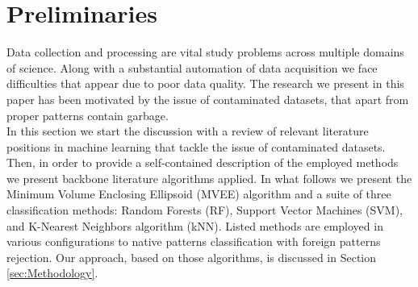\documentclass{llncs}
\begin{document}
\section{Preliminaries}
  \label{sec:preliminaries}
  
  
  
    
Data collection and processing are vital study problems across multiple domains of science. Along with a substantial automation of data acquisition we face difficulties that appear due to poor data quality. The research we present in this paper has been motivated by the issue of contaminated datasets, that apart from proper patterns contain garbage. \\


In this section we start the discussion with a review of relevant literature positions in machine learning that tackle the issue of contaminated datasets. Then, in order to provide a self-contained description of the employed methods we present backbone literature algorithms applied. In what follows we present the Minimum Volume Enclosing Ellipsoid (MVEE) algorithm and a suite of three classification methods: Random Forests (RF), Support Vector Machines (SVM), and K-Nearest Neighbors algorithm (kNN). Listed methods are employed in various configurations to native patterns classification with foreign patterns rejection. Our approach, based on those algorithms, is discussed in Section \ref{sec:Methodology}.
\end{document}
